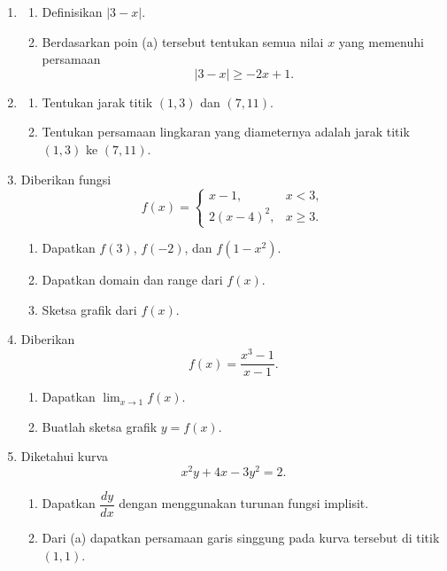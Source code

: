 \documentclass[10pt,letterpaper]{article}
\begin{document}
\begin{enumerate}

  \item \begin{enumerate}
          \item Definisikan $|3-x|$.
          \item Berdasarkan poin (a) tersebut tentukan semua nilai $x$ yang
                memenuhi persamaan
                \[
                  |3-x|\ge-2x+1.
                \]
        \end{enumerate}

  \item \begin{enumerate}
          \item Tentukan jarak titik $(1,3)$ dan $(7,11)$.
          \item Tentukan persamaan lingkaran yang diameternya adalah jarak titik
                $(1,3)$ ke $(7,11)$.
        \end{enumerate}

  \item Diberikan fungsi
        \[
          f(x)=
          \begin{cases}
            x-1,      & x<3,   \\
            2(x-4)^2, & x\ge3.
          \end{cases}
        \]
        \begin{enumerate}
          \item Dapatkan $f(3)$, $f(-2)$, dan $f(1-x^2)$.
          \item Dapatkan domain dan range dari $f(x)$.
          \item Sketsa grafik dari $f(x)$.
        \end{enumerate}

  \item Diberikan
        \[
          f(x)=\frac{x^3-1}{x-1}.
        \]
        \begin{enumerate}
          \item Dapatkan $\displaystyle\lim_{x\to1}f(x)$.
          \item Buatlah sketsa grafik $y=f(x)$.
        \end{enumerate}

  \item Diketahui kurva
        \[
          x^2y+4x-3y^2=2.
        \]
        \begin{enumerate}
          \item Dapatkan $\dfrac{dy}{dx}$ dengan menggunakan turunan fungsi implisit.
          \item Dari (a) dapatkan persamaan garis singgung pada kurva tersebut di titik $(1,1)$.
        \end{enumerate}

\end{enumerate}
\end{document}
